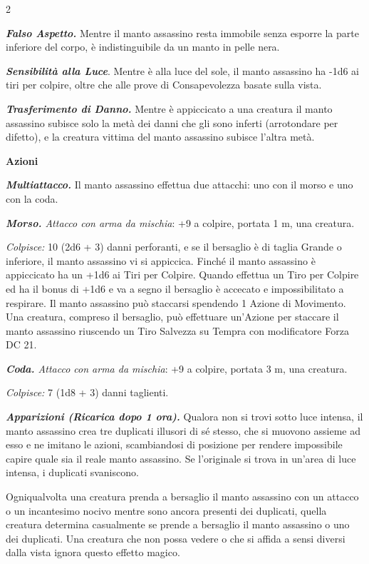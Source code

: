 \begin{multicols}{2}
{\emph{\textbf{Falso Aspetto.}} Mentre il manto assassino resta immobile senza esporre la parte inferiore del corpo, è indistinguibile da un manto in pelle nera.

\emph{\textbf{Sensibilità alla Luce}}. Mentre è alla luce del sole, il manto assassino ha -1d6 ai tiri per colpire, oltre che alle prove di Consapevolezza basate sulla vista.

\emph{\textbf{Trasferimento di Danno.}} Mentre è appiccicato a una creatura il manto assassino subisce solo la metà dei danni che gli sono inferti (arrotondare per difetto), e la creatura vittima del manto assassino subisce l'altra metà.

\textbf{Azioni}

\emph{\textbf{Multiattacco.}} Il manto assassino effettua due attacchi: uno con il morso e uno con la coda.

\emph{\textbf{Morso.} Attacco con arma da mischia}: +9 a colpire, portata 1 m, una creatura.

\emph{Colpisce:} 10 (2d6 + 3) danni perforanti, e se il bersaglio è di taglia Grande o inferiore, il manto assassino vi si appiccica.
Finché il manto assassino è appiccicato ha un +1d6 ai Tiri per Colpire. Quando effettua un Tiro per Colpire ed ha il bonus di +1d6 e va a segno il bersaglio è accecato e impossibilitato a respirare. Il manto assassino può staccarsi spendendo 1 Azione di Movimento. Una creatura, compreso il bersaglio, può effettuare un'Azione per staccare il manto assassino riuscendo un Tiro Salvezza su Tempra con modificatore Forza DC 21.

\emph{\textbf{Coda.} Attacco con arma da mischia}: +9 a colpire, portata 3 m, una creatura.

\emph{Colpisce:} 7 (1d8 + 3) danni taglienti.

\emph{\textbf{Apparizioni (Ricarica dopo 1 ora).}} Qualora non si trovi sotto luce intensa, il manto assassino crea tre duplicati illusori di sé stesso, che si muovono assieme ad esso e ne imitano le azioni, scambiandosi di posizione per rendere impossibile capire quale sia il reale manto assassino. Se l'originale si trova in un'area di luce intensa, i duplicati svaniscono.

Ogniqualvolta una creatura prenda a bersaglio il manto assassino con un attacco o un incantesimo nocivo mentre sono ancora presenti dei duplicati, quella creatura determina casualmente se prende a bersaglio il manto assassino o uno dei duplicati. Una creatura che non possa vedere o che si affida a sensi diversi dalla vista ignora questo effetto magico.

}
\end{multicols}
